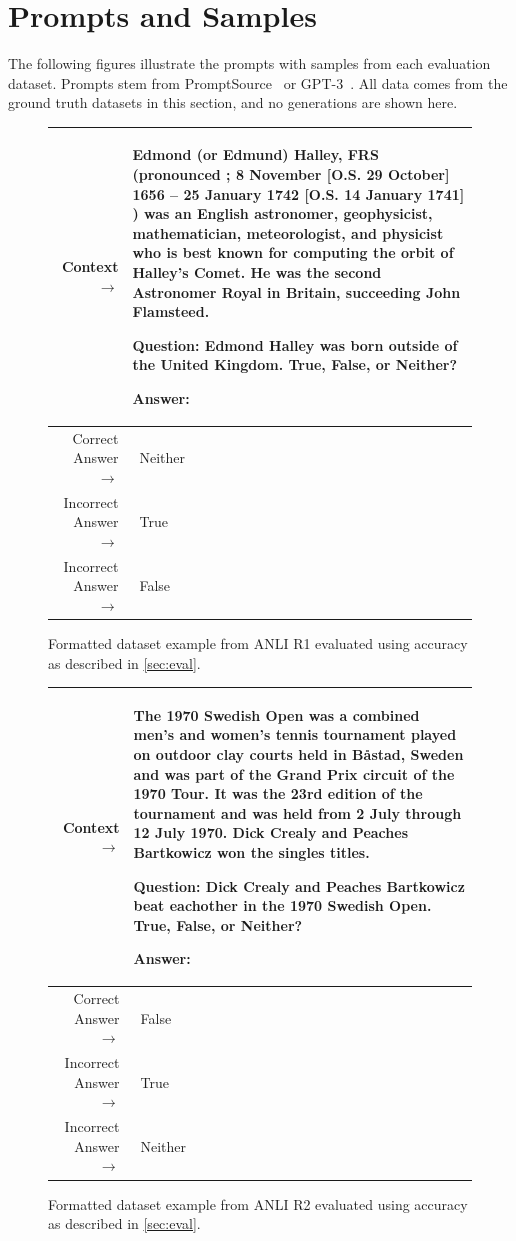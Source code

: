 \documentclass{article}
\begin{document}
\section{Prompts and Samples}
\label{sec:samples}

The following figures illustrate the prompts with samples from each evaluation dataset. Prompts stem from PromptSource~\cite{promptsource} or GPT-3~\cite{brown2020language}. All data comes from the ground truth datasets in this section, and no generations are shown here.

\begin{figure}[!h] { \tt \footnotesize \begin{tabularx}{\linewidth}{r X} \toprule Context $\to$ & Edmond (or Edmund) Halley, FRS (pronounced ; 8 November [O.S. 29 October] 1656 – 25 January 1742 [O.S. 14 January 1741] ) was an English astronomer, geophysicist, mathematician, meteorologist, and physicist who is best known for computing the orbit of Halley's Comet. He was the second Astronomer Royal in Britain, succeeding John Flamsteed.

Question: Edmond Halley was born outside of the United Kingdom. True, False, or Neither?

Answer:\\
 \midrule 
 Correct Answer $\to$ & ~Neither \\ 
 Incorrect Answer $\to$ & ~True \\ 
 Incorrect Answer $\to$ & ~False \\
 \bottomrule \end{tabularx} }
 \caption{Formatted dataset example from ANLI R1 evaluated using accuracy as described in \autoref{sec:eval}.}
 \label{eval:anlir1}
 \end{figure}

\begin{figure}[!h] { \tt \footnotesize \begin{tabularx}{\linewidth}{r X} \toprule Context $\to$ & The 1970 Swedish Open was a combined men's and women's tennis tournament played on outdoor clay courts held in Båstad, Sweden and was part of the Grand Prix circuit of the 1970 Tour. It was the 23rd edition of the tournament and was held from 2 July through 12 July 1970. Dick Crealy and Peaches Bartkowicz won the singles titles.

Question: Dick Crealy and Peaches Bartkowicz beat eachother in the 1970 Swedish Open. True, False, or Neither?

Answer:\\
\midrule 
Correct Answer $\to$ & ~False \\ 
Incorrect Answer $\to$ & ~True \\ 
Incorrect Answer $\to$ & ~Neither \\
\bottomrule \end{tabularx} }
\caption{Formatted dataset example from ANLI R2 evaluated using accuracy as described in \autoref{sec:eval}.}  
\label{eval:anlir2}  
\end{figure}
 
\end{document}
